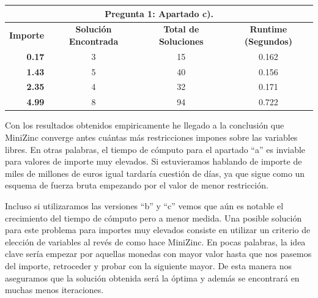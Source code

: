 \documentclass[12pt,letterpaper]{article}
\numberwithin{equation}{section} %
\numberwithin{figure}{section} %
\numberwithin{table}{section} %
\begin{document}
\begin{table}[H]
    \small
    \centering
\begin{tabular}{|rccc|}
\hline
\multicolumn{4}{|c|}{\textbf{Pregunta 1: Apartado c).}}                                                                                                                                    \\ \hline
\multicolumn{1}{|c|}{\textbf{Importe}} & \multicolumn{1}{c|}{\textbf{Solución Encontrada}} & \multicolumn{1}{c|}{\textbf{Total de Soluciones}} & \textbf{Runtime (Segundos)} \\ \hline
\multicolumn{1}{|r|}{\textbf{0.17}}    & \multicolumn{1}{c|}{3}                                   & \multicolumn{1}{c|}{15}                                  & 0.162                       \\ \hline
\multicolumn{1}{|r|}{\textbf{1.43}}    & \multicolumn{1}{c|}{5}                                   & \multicolumn{1}{c|}{40}                                  & 0.156                       \\ \hline
\multicolumn{1}{|r|}{\textbf{2.35}}    & \multicolumn{1}{c|}{4}                                   & \multicolumn{1}{c|}{32}                                  & 0.171                       \\ \hline
\multicolumn{1}{|r|}{\textbf{4.99}}    & \multicolumn{1}{c|}{8}                                   & \multicolumn{1}{c|}{94}                                  & 0.722                       \\ \hline
\end{tabular}
\end{table}

Con los resultados obtenidos empiricamente he llegado a la conclusión que MiniZinc
converge antes cuántas más restricciones impones sobre las variables libres. En
otras palabras, el tiempo de cómputo para el apartado ``a'' es inviable para
valores de importe muy elevados. Si estuvieramos hablando de importe de miles
de millones de euros igual tardaría cuestión de días, ya que sigue como
un esquema de fuerza bruta empezando por el valor de menor restricción.
\par
Incluso si utilizaramos las versiones ``b'' y ``c'' vemos que aún es notable
el crecimiento del tiempo de cómputo pero a menor medida. Una posible solución
para este problema para importes muy elevados consiste en utilizar un criterio
de elección de variables al revés de como hace MiniZinc. En pocas palabras,
la idea clave sería empezar por aquellas monedas con mayor valor hasta que
nos pasemos del importe, retroceder y probar con la siguiente mayor. De esta
manera nos aseguramos que la solución obtenida será la óptima y además se
encontrará en muchas menos iteraciones.
\end{document}
